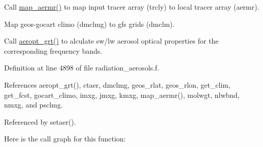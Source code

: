 \begin{DoxyEnumerate}
\item Call \hyperlink{group__module__radiation__aerosols_ga651c4be2fa354238990c5c7b9488e9fd}{map\+\_\+aermr()} to map input tracer array (trcly) to local tracer array (aermr).
\item Map geos-\/gocart climo (dmclmg) to gfs grids (dmclm).
\item Call \hyperlink{group__module__radiation__aerosols_ga4ff866c545425e7029a11999e97d8faa}{aeropt\+\_\+grt()} to alculate sw/lw aerosol optical properties for the corresponding frequency bands. 
\end{DoxyEnumerate}

Definition at line 4898 of file radiation\+\_\+aerosols.\+f.



References aeropt\+\_\+grt(), ctaer, dmclmg, geos\+\_\+rlat, geos\+\_\+rlon, get\+\_\+clim, get\+\_\+fcst, gocart\+\_\+climo, imxg, jmxg, kmxg, map\+\_\+aermr(), molwgt, nlwbnd, nmxg, and psclmg.



Referenced by setaer().

Here is the call graph for this function\+:
